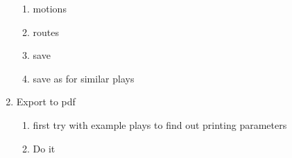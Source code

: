 \documentclass[10pt,a4paper]{article}
\begin{document}
\begin{enumerate}
\begin{enumerate}
					\item motions
					
					\item routes
					
					\item save
					
					\item save as for similar plays
				\end{enumerate}
				
			\item Export to pdf
				\begin{enumerate}
					\item first try with example plays to find out printing parameters
					
					\item Do it
				\end{enumerate}
		\end{enumerate}
\end{document}
